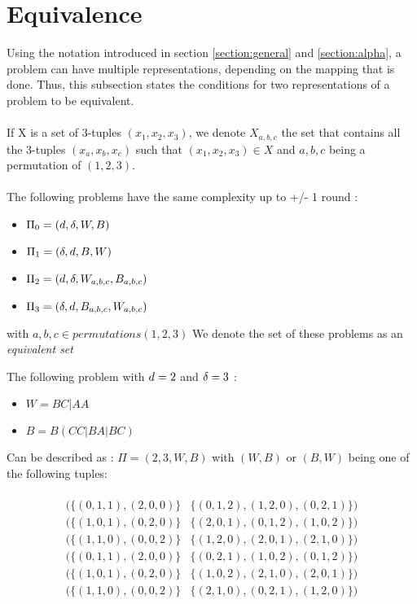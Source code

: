 \section{Equivalence}
Using the notation introduced in section \ref{section:general} and \ref{section:alpha}, a problem can have multiple representations, depending on the mapping that is done. Thus, this subsection states the conditions for two representations of a problem to be equivalent.\\\\
If X is a set of 3-tuples $(x_1,x_2, x_3)$, we denote $X_{a,b,c}$ the set that contains all the 3-tuples $(x_a,x_b, x_c)$ such that $(x_1,x_2, x_3)\in X$ and $a,b,c$ being a permutation of $(1,2,3) $.\\\\
The following problems have the same complexity up to +/- 1 round : 
\begin{itemize}
    \item $\Pi_0 = (d,\delta,W,B)$
    \item $\Pi_1 = (\delta,d,B,W)$
    \item $\Pi_2 = (d,\delta,W_{a,b,c},B_{a,b,c})$
    \item $\Pi_3 = (\delta,d,B_{a,b,c},W_{a,b,c})$
\end{itemize}
with $a,b,c \in permutations(1,2,3)$
We denote the set of these problems as an \textit{equivalent set}
\begin{exmp}
The following problem with $d = 2$ and $\delta = 3$ :
\begin{itemize}
    \item $W = BC|AA$
    \item $B = B(CC|BA|BC)$
\end{itemize}
Can be described as :
$\Pi = (2,3,W,B)$ with $(W,B)$ or $(B,W)$ being one of the following tuples:\\\\
$$\begin{array}{cc}
    ( \{(0,1,1),(2, 0, 0)\} &  \{(0,1,2),(1,2,0),(0,2,1)\} )\\
    ( \{(1,0,1),(0, 2, 0)\} &  \{(2,0,1),(0,1,2),(1,0,2)\} )\\
    ( \{(1,1,0),(0, 0, 2)\} &  \{(1,2,0),(2,0,1),(2,1,0)\} )\\
    ( \{(0,1,1),(2, 0, 0)\} &  \{(0,2,1),(1,0,2),(0,1,2)\} )\\
    ( \{(1,0,1),(0, 2, 0)\} &  \{(1,0,2),(2,1,0),(2,0,1)\} )\\
    ( \{(1,1,0),(0, 0, 2)\} &  \{(2,1,0),(0,2,1),(1,2,0)\} )
\end{array}$$
\end{exmp}
